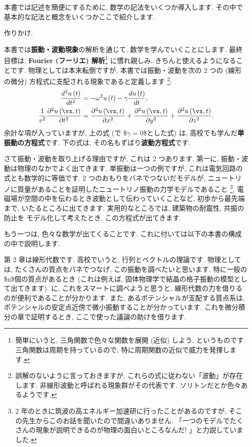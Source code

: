 \documentclass[openany, a4paper, oneside]{jsbook}
\theoremstyle{break}
\theoremstyle{breakdefn}
\newcommand{\rbk}[1]{\left (#1\right)}
\newcommand{\pd}{\partial}
\begin{document}
本書では記述を簡便にするために, 数学の記法をいくつか導入します.
その中で基本的な記法と概念をいくつかここで紹介します.

作りかけ.

本書では\textbf{振動・波動現象}の解析を通じて, 数学を学んでいくことにします.
最終目標は, \textbf{Fourier (フーリエ) 解析}\footnote{簡単にいうと, 三角関数で色々な関数を展開 (近似) しよう, というものです.
三角関数は周期を持っているので, 特に周期関数の近似で威力を発揮します.
 }
に慣れ親しみ, きちんと使えるようになることです.
物理としては本末転倒ですが,
本書では振動・波動を次の 2 つの (線形の微分) 方程式に支配される現象であると定義します \footnote{誤解のないように言っておきますが, これらの式に従わない「波動」が存在します.
非線形波動と呼ばれる現象群がその代表です.
ソリトンだとか色々あるようです.
 }:
\begin{align}
 \frac{d^2 u \rbk{t} }{d t^2}
 &=
 -\omega^2 u \rbk{t} - \gamma \frac{d u \rbk{t}}{dt} , \\
 \frac{1}{v^2} \frac{\pd^2 u \rbk{ \vx , t }}{\pd t^2}
 &=
 \frac{\pd^2 u \rbk{\vx , t}}{\pd x^2} + \frac{\pd^2 u \rbk{\vx , t}}{\pd y^2} + \frac{\pd^2 u \rbk{\vx , t}}{\pd z^2}.
\end{align}
余計な項が入っていますが, 上の式 (で \$$\gamma$ = 0\$とした式) は,
高校でも学んだ\textbf{単振動の方程式}です.
下の式は, その名もずばり\textbf{波動方程式}です.

さて振動・波動を取り上げる理由ですが, これは 2 つあります.
第一に, 振動・波動は物理のなかでよく出てきます.
単振動は一つの例ですが, これは電気回路の式とも数学的に等価です.
2 つのおもりをバネでつないだモデルが,
ニュートリノに質量があることを証明したニュートリノ振動の力学モデルであること \footnote{2 年のときに筑波の高エネルギー加速研に行ったことがあるのですが,
そこの先生からこのお話を聞いたので間違いありません.
「一つのモデルでたくさんの現象が説明できるのが物理の面白いところなんだ! 」と力説していました.
 },
電磁場が空間の中を伝わるとき波動として伝わっていくことなど,
初歩から最先端まで, いたるところに出てきます.
実用的なところでは, 建築物の耐震性, 共振の防止を
モデル化して考えたとき. この方程式が出てきます.

もう一つは, 色々な数学が出てくることです.
これに付いては以下の本書の構成の中で説明します.

第 2 章は線形代数です.
高校でいうと, 行列とベクトルの理論です.
物理としては, たくさんの質点をバネでつなげ, この振動を調べたいと思います.
特に一般の \$n\$個の質点があるとき (これは例えば, 固体物理学で結晶の格子振動の模型として出てきます). に,
これをスマートに調べようと思うと,
線形代数の力を借りるのが便利であることが分かります.
また, あるポテンシャルが支配する質点系は,
ポテンシャルの安定点近傍で微小振動することが分かっています.
これを微分積分の章で証明するとき, ここで使った議論の助けを借ります.
\end{document}
